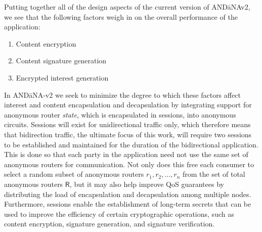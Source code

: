 Putting together all of the design aspects of the current version of {\sf AND\=aNAv2}, we see that the following factors weigh in on the overall performance of the application:
\begin{enumerate}
  \item Content encryption
  \item Content signature generation
  \item Encrypted interest generation
\end{enumerate} 
In {\sf AND\=aNA-v2} we seek to minimize the degree to which these factors affect interest and content encapsulation and decapsulation by integrating support for anonymous router \emph{state}, which is encapsulated in sessions, into anonymous circuits. Sessions will exist for unidirectional traffic only, which therefore means that bidirection traffic, the ultimate focus of this work, will require two sessions to be established and maintained for the duration of the bidirectional application. This is done so that each party in the application need not use the same set of anonymous routers for communication. Not only does this free each consumer to select a random subset of anonymous routers $r_1,r_2,\dots,r_n$ from the set of total anonymous routers $\mathsf{R}$, but it may also help improve QoS guarantees by distributing the load of encapsulation and decapsulation among multiple nodes. Furthermore, sessions enable the establishment of long-term secrets that can be used to improve the efficiency of certain cryptographic operations, such as content encryption, signature generation, and signature verification. 


